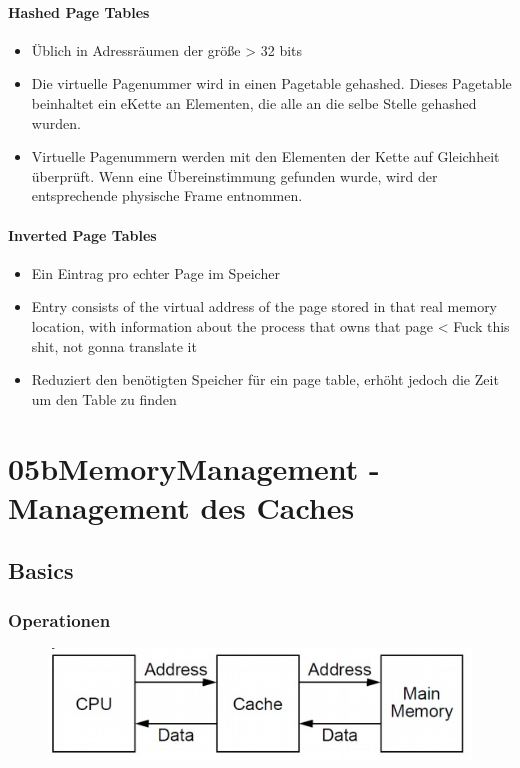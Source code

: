 \documentclass[a4paper]{scrreprt}
\begin{document}
\subsubsection{Hashed Page Tables}
\begin{itemize}
\item Üblich in Adressräumen der größe > 32 bits
\item Die virtuelle Pagenummer wird in einen Pagetable gehashed. Dieses Pagetable beinhaltet ein eKette an Elementen, die alle an die selbe Stelle gehashed wurden.
\item Virtuelle Pagenummern werden mit den Elementen der Kette auf Gleichheit überprüft. Wenn eine Übereinstimmung gefunden wurde, wird der entsprechende physische Frame entnommen.
\end{itemize}

\subsubsection{Inverted Page Tables}
\begin{itemize}
\item Ein Eintrag pro echter Page im Speicher
\item Entry consists of the virtual address of the page stored in that real 
memory location, with information about the process that owns that 
page < Fuck this shit, not gonna translate it
\item Reduziert den benötigten Speicher für ein page table, erhöht jedoch die Zeit um den Table zu finden

\end{itemize}
\chapter{05bMemoryManagement -  Management des Caches}
\section{Basics}
\subsection{Operationen}
\begin{figure}[ht]
\centering
\includegraphics[scale=0.4]{graphics/operation.png}
\end{figure}
\end{document}
